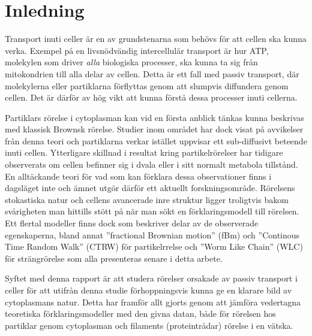 \chapter{Inledning}



Transport inuti celler är en av grundstenarna som behövs för att cellen ska kunna verka. Exempel på en livsnödvändig intercellulär transport är hur ATP, molekylen som driver \emph{alla} biologiska processer, ska kunna ta sig från mitokondrien till alla delar av cellen. Detta är ett fall med passiv transport, där molekylerna eller partiklarna förflyttas genom att slumpvis diffundera genom cellen. Det är därför av hög vikt att kunna förstå dessa processer inuti cellerna.

Partiklars rörelse i cytoplasman kan vid en första anblick tänkas kunna beskrivas med klassisk Brownsk rörelse. Studier inom området \cite{Gou_etal2014} har dock visat på avvikelser från denna teori och partiklarna verkar istället uppvisar ett sub-diffusivt beteende inuti cellen. Ytterligare skillnad i resultat kring partikelrörelser har tidigare observerats om cellen befinner sig i dvala eller i sitt normalt metabola tillstånd. En alltäckande teori för vad som kan förklara dessa observationer finns i dagsläget inte och ämnet utgör därför ett aktuellt forskningsområde.
Rörelsens stokastiska natur och cellens avancerade inre struktur ligger troligtvis bakom svårigheten man hittills stött på när man sökt en förklaringsmodell till rörelsen. Ett flertal modeller finns dock som beskriver delar av de observerade egenskaperna, bland annat ''fractional Brownian motion'' (fBm) och ''Continous Time Random Walk'' (CTRW) för partikelrrelse och ''Worm Like Chain'' (WLC) för strängrörelse som alla presenteras senare i detta arbete.

Syftet med denna rapport är att studera rörelser orsakade av passiv transport i celler för att utifrån denna studie förhoppningsvis kunna ge en klarare bild av cytoplasmans natur. Detta har framför allt gjorts genom att jämföra vedertagna teoretiska förklaringsmodeller med den givna datan, både för rörelsen hos partiklar genom cytoplasman och filaments (proteintrådar) rörelse i en vätska. %


